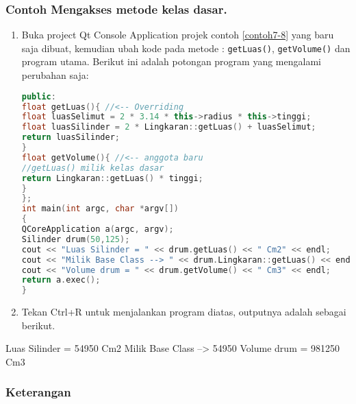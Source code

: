 \subsubsection*{Contoh  Mengakses metode kelas dasar.}

\begin{enumerate}

\item
  Buka project Qt Console Application projek contoh \ref{contoh7-8} yang baru saja
  dibuat, kemudian ubah kode pada metode : \texttt{getLuas()},
  \texttt{getVolume()} dan program utama. Berikut ini adalah potongan
  program yang mengalami perubahan saja:

\begin{lstlisting}[language=c++, caption=Mengakses metode kelas dasar, label=contoh7-8]
public:
float getLuas(){ //<-- Overriding
float luasSelimut = 2 * 3.14 * this->radius * this->tinggi;
float luasSilinder = 2 * Lingkaran::getLuas() + luasSelimut;
return luasSilinder;
}
float getVolume(){ //<-- anggota baru
//getLuas() milik kelas dasar
return Lingkaran::getLuas() * tinggi;
}
};
int main(int argc, char *argv[])
{
QCoreApplication a(argc, argv);
Silinder drum(50,125);
cout << "Luas Silinder = " << drum.getLuas() << " Cm2" << endl;
cout << "Milik Base Class --> " << drum.Lingkaran::getLuas() << endl;
cout << "Volume drum = " << drum.getVolume() << " Cm3" << endl;
return a.exec();
}
\end{lstlisting}
\item
  Tekan Ctrl+R untuk menjalankan program diatas, outputnya adalah
  sebagai berikut.
\end{enumerate}

\begin{lcverbatim}
Luas Silinder = 54950 Cm2
Milik Base Class --> 54950
Volume drum = 981250 Cm3
\end{lcverbatim}

\subsubsection*{Keterangan}

